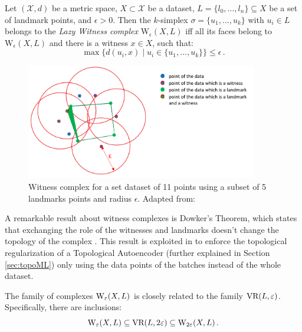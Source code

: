 \documentclass[../main.tex]{subfiles}
\begin{document}
\begin{definition}
Let $(\mathcal{X}, d)$ be a metric space, $X \subset \mathcal{X}$ be a dataset, $L = \{l_0, ..., l_n\} \subseteq X$ be a set of landmark points, and $\epsilon>0$. Then the $k$-simplex $\sigma = \{u_1, ..., u_k\}$ with $u_i \in L$ belongs to the \emph{Lazy Witness complex} $\text{W}_\epsilon(X, L)$ iff all its faces belong to $\text{W}_\epsilon(X, L)$ and there is a witness $x \in X$, such that:
\[
\max \{d(u_i, x) \mid u_i \in \{u_1, ..., u_k\}\} \leq \epsilon\,.
\]
\end{definition}

\begin{figure}[!ht]
\centering
\includegraphics[width=0.9\textwidth]{figures/bg/witnessCons.png} 
    \caption{Witness complex for a set  dataset of 11 points using a subset of 5 landmarks points and radius $\epsilon$. Adapted from: \cite{medbouhi_towards_2022}}
\label{fig:witnessCons}
\end{figure}

A remarkable result about witness complexes is Dowker's Theorem, which states that exchanging the role of the witnesses and landmarks doesn't change the topology of the complex \cite{dowker_homology_1952}. This result is exploited in \cite{schonenberger_witness_2022} to enforce the topological regularization of a Topological Autoencoder (further explained in Section \ref{sec:topoML}) only using the data points of the batches instead of the whole dataset.

\begin{proposition}
\label{prop:witness-vr}
The family of complexes $\text{\rm W}_\epsilon(X, L)$ is closely related to the family $\text{\rm VR}(L, \epsilon)$. Specifically, there are inclusions:
\[
\text{\rm W}_\epsilon(X, L) \subseteq \text{\rm VR}(L, 2\epsilon) \subseteq \text{\rm W}_{2\epsilon}(X, L)\,.
\]
\end{proposition}
\end{document}
